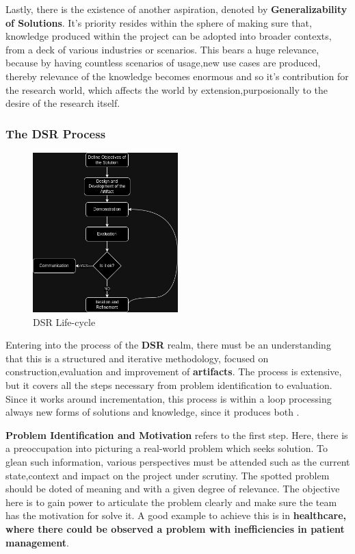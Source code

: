 Lastly, there is the existence of another aspiration, denoted by \textbf{Generalizability of Solutions}. It's priority resides within the 
sphere of making sure that, knowledge produced within the project can be adopted into broader contexts, from a deck of various industries
or scenarios. This bears a huge relevance, because by having countless scenarios of usage,new use cases are produced, thereby relevance of 
the knowledge becomes enormous and so it's contribution for the research world, which affects the world by extension,purposionally to the desire of the 
research itself.

\subsubsection{The DSR Process}
\begin{figure}[H]
    \centering
    \includegraphics[width=0.5\textwidth]{assets/tools/dsr/DSR.drawio.png} %
    \caption{DSR Life-cycle}
    \label{fig:sample-image} 
\end{figure}
Entering into the process of the \textbf{DSR} realm, there must be an understanding that this is a structured and iterative methodology, 
focused on construction,evaluation and improvement of \textbf{artifacts}. The process is extensive, but it covers all the steps necessary 
from problem identification to evaluation. Since it works around incrementation, this process is within a loop processing always new forms 
of solutions and knowledge, since it produces both \cite{dsr-book}.

\textbf{Problem Identification and Motivation} refers to the first step. Here, there is a preoccupation into picturing a real-world 
problem which seeks solution. To glean such information, various perspectives must be attended such as the current state,context and 
impact on the project under scrutiny. The spotted problem should be doted of meaning and with a given degree of relevance. The objective 
here is to gain power to articulate the problem clearly and make sure the team has the motivation for solve it. A good example to 
achieve this is in \textbf{healthcare, where there could be observed a problem with inefficiencies in patient management}.

